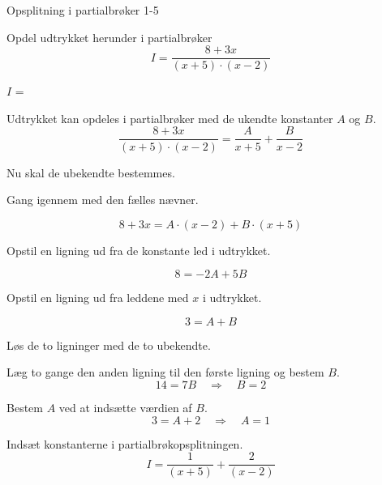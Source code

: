 \documentclass{article}
\begin{document}
\begin{exercise}{Opsplitning i partialbrøker 1-5}

Opdel udtrykket herunder i partialbrøker
\[
I = \frac{8 + 3x}{(x + 5) \cdot (x - 2)}
\]

$I$ = 

\hint
Udtrykket kan opdeles i partialbrøker med de ukendte konstanter $A$ og $B$.
\[
\frac{8 + 3x}{(x + 5) \cdot (x - 2)} =
\frac{A}{x + 5} + \frac{B}{x - 2}
\]

\hint
Nu skal de ubekendte bestemmes.

\hint
Gang igennem med den fælles nævner.

\hint
\[
8 + 3x = A \cdot (x - 2) + B \cdot (x + 5)
\]

\hint
Opstil en ligning ud fra de konstante led i udtrykket.

\hint
\[
8 = -2A + 5B
\]

\hint
Opstil en ligning ud fra leddene med $x$ i udtrykket.

\hint
\[
3 = A + B
\]

\hint
Løs de to ligninger med de to ubekendte.

\hint
Læg to gange den anden ligning til den første ligning og bestem $B$.
\[
14 = 7B \quad \Rightarrow \quad B = 2
\]

\hint
Bestem $A$ ved at indsætte værdien af $B$.
\[
3 = A + 2 \quad \Rightarrow\quad A = 1
\]

\hint
Indsæt konstanterne i partialbrøkopsplitningen.
\[
I = \frac{1}{(x + 5)} + \frac{2}{(x - 2)}
\]



\end{exercise}
\end{document}
